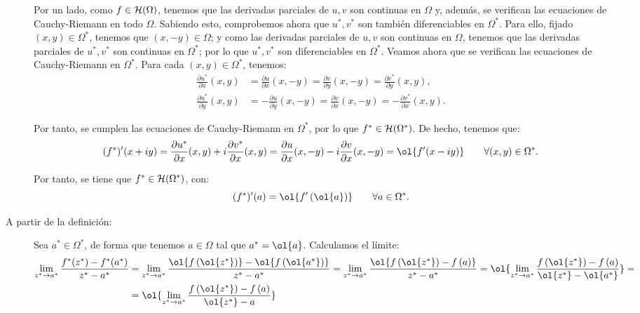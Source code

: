 \begin{ejercicio}
\begin{description}
        Por un lado, como $f\in \mathcal{H}(\Omega)$, tenemos que las derivadas parciales de $u,v$ son continuas en $\Omega$ y, además, se verifican las ecuaciones de Cauchy-Riemann en todo $\Omega$. Sabiendo esto, comprobemos ahora que $u^*,v^*$ son también diferenciables en $\Omega^*$. Para ello, fijado $(x,y)\in\Omega^*$, tenemos que $(x,-y)\in\Omega$; y como las derivadas parciales de $u,v$ son continuas en $\Omega$, tenemos que las derivadas parciales de $u^*,v^*$ son continuas en $\Omega^*$; por lo que $u^*,v^*$ son diferenciables en $\Omega^*$. Veamos ahora que se verifican las ecuaciones de Cauchy-Riemann en $\Omega^*$. Para cada $(x,y)\in\Omega^*$, tenemos:
        \begin{align*}
            \frac{\partial u^*}{\partial x}(x,y) &= \frac{\partial u}{\partial x}(x,-y) = \frac{\partial v}{\partial y}(x,-y) = \frac{\partial v^*}{\partial y}(x,y),\\
            \frac{\partial u^*}{\partial y}(x,y) &= -\frac{\partial u}{\partial y}(x,-y) = \frac{\partial v}{\partial x}(x,-y) = -\frac{\partial v^*}{\partial x}(x,y).
        \end{align*}

        Por tanto, se cumplen las ecuaciones de Cauchy-Riemann en $\Omega^*$, por lo que $f^*\in \mathcal{H}(\Omega^*)$.
        De hecho, tenemos que:
        \begin{equation*}
            (f^*)'(x+iy) = \frac{\partial u^*}{\partial x}(x,y) + i\frac{\partial v^*}{\partial x}(x,y) = \dfrac{\partial u}{\partial x}(x,-y) -i\dfrac{\partial v}{\partial x}(x,-y) = \ol{f'(x-iy)} \qquad \forall (x,y)\in\Omega^*.
        \end{equation*}

        Por tanto, se tiene que $f^*\in \mathcal{H}(\Omega^*)$, con:
        \[
            (f^*)'(a) = \ol{f'\left(\ol{a}\right)}\qquad \forall a\in\Omega^*.
        \]

        \item[A partir de la definición:]
        
        Sea $a^*\in\Omega^*$, de forma que tenemos $a\in\Omega$ tal que $a^*=\ol{a}$. Calculamos el límite:
        \begin{align*}
            \lim_{z^*\to a^*}\dfrac{f^*(z^*)-f^*(a^*)}{z^*-a^*}
            &= \lim_{z^*\to a^*}\dfrac{\ol{f\left(\ol{z^*}\right)}-\ol{f\left(\ol{a^*}\right)}}
            {z^*-a^*}
            = \lim_{z^*\to a^*}\dfrac{\ol{f\left(\ol{z^*}\right)-f\left(a\right)}}
            {z^*-a^*}
            = \ol{\lim_{z^*\to a^*}\dfrac{f\left(\ol{z^*}\right)-f\left(a\right)}
            {\ol{z^*}-\ol{a^*}}}
            =\\&= \ol{\lim_{z^*\to a^*}\dfrac{f\left(\ol{z^*}\right)-f\left(a\right)}
            {\ol{z^*}-a}}
        \end{align*}


\end{description}
\end{ejercicio}
